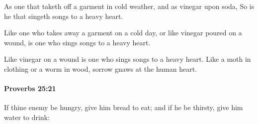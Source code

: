 			\begin{versebox}
					\item[BHS] 
					\item[ASV] As one that taketh off a garment in cold weather, and as vinegar upon soda, So is he that singeth songs to a heavy heart.
					\item[NIV] Like one who takes away a garment on a cold day, or like vinegar poured on a wound, is one who sings songs to a heavy heart.
					\item[NRSV] Like vinegar on a wound is one who sings songs to a heavy heart. Like a moth in clothing or a worm in wood, sorrow gnaws at the human heart.
			\end{versebox}

		\paragraph{Proverbs 25:21} %
			\label{PROVERBS-25-21}

			If thine enemy be hungry, give him bread to eat; and if he be thirsty, give him water to drink:

